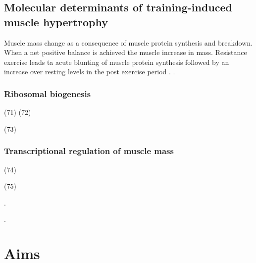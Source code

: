\documentclass[twoside,10pt]{gihclass} %
\begin{document}
\hypertarget{molecular-determinants-of-training-induced-muscle-hypertrophy}{%
\section{Molecular determinants of training-induced muscle hypertrophy}\label{molecular-determinants-of-training-induced-muscle-hypertrophy}}

Muscle mass change as a consequence of muscle protein synthesis and breakdown. When a net positive balance is achieved the muscle increase in mass. Resistance exercise leads ta acute blunting of muscle protein synthesis followed by an increase over resting levels in the post exercise period
.
.

\hypertarget{ribosomal-biogenesis}{%
\subsection{Ribosomal biogenesis}\label{ribosomal-biogenesis}}

(71)
(72)

(73)

\hypertarget{transcriptional-regulation-of-muscle-mass}{%
\subsection{Transcriptional regulation of muscle mass}\label{transcriptional-regulation-of-muscle-mass}}

(74)

(75)

.

.

\hypertarget{aims}{%
\chapter{Aims}\label{aims}}
\end{document}
